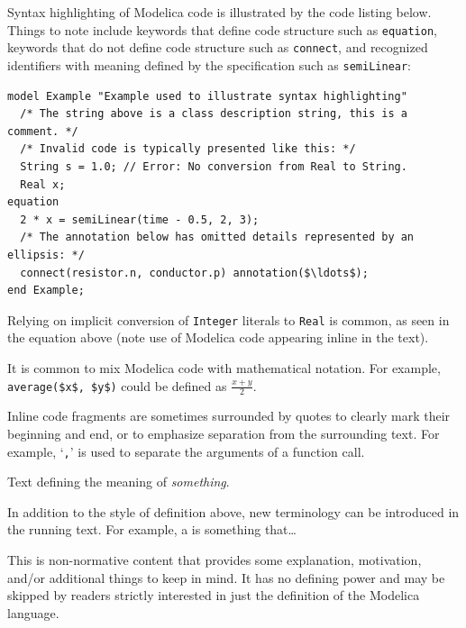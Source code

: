 Syntax highlighting of Modelica code is illustrated by the code listing below.
Things to note include keywords that define code structure such as \lstinline!equation!, keywords that do not define code structure such as \lstinline!connect!, and recognized identifiers with meaning defined by the specification such as \lstinline!semiLinear!:
\begin{lstlisting}[language=modelica]
model Example "Example used to illustrate syntax highlighting"
  /* The string above is a class description string, this is a comment. */
  /* Invalid code is typically presented like this: */
  String s = 1.0; // Error: No conversion from Real to String.
  Real x;
equation
  2 * x = semiLinear(time - 0.5, 2, 3);
  /* The annotation below has omitted details represented by an ellipsis: */
  connect(resistor.n, conductor.p) annotation($\ldots$);
end Example;
\end{lstlisting}

Relying on implicit conversion of \lstinline!Integer! literals to \lstinline!Real! is common, as seen in the equation above (note use of Modelica code appearing inline in the text).

It is common to mix Modelica code with mathematical notation.
For example, \lstinline!average($x$, $y$)! could be defined as $\frac{x + y}{2}$.

Inline code fragments are sometimes surrounded by quotes to clearly mark their beginning and end, or to emphasize separation from the surrounding text.
For example, `\lstinline!,!' is used to separate the arguments of a function call.

\begin{definition}[Something]%
Text defining the meaning of \emph{something}.
\end{definition}

In addition to the style of definition above, new terminology can be introduced in the running text.
For example, a  is something that\ldots

\begin{nonnormative}
This is non-normative content that provides some explanation, motivation, and/or additional things to keep in mind.
It has no defining power and may be skipped by readers strictly interested in just the definition of the Modelica language.
\end{nonnormative}


